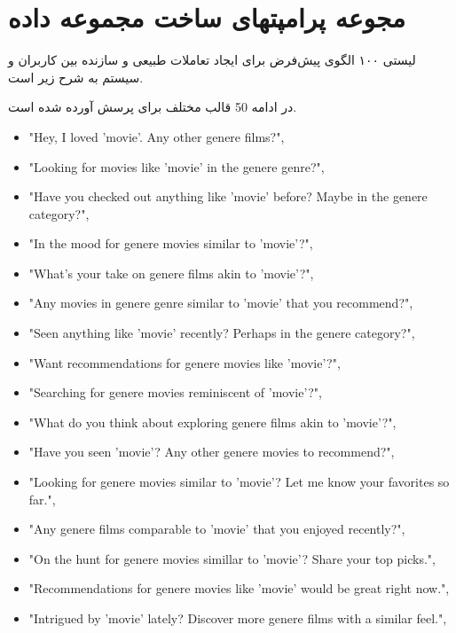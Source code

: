 
\chapter{مجوعه پرامپتهای ساخت مجموعه داده}
\label{app:naturalDiscussionTemplate}

\thispagestyle{empty}



لیستی ۱۰۰ الگوی پیش‌فرض برای ایجاد تعاملات طبیعی و سازنده بین کاربران و سیستم  به شرح زیر است.

در ادامه 50 قالب مختلف برای پرسش آورده شده است.

\begin{LTR}
\begin{itemize}
\item    
"Hey, I loved '{movie}'. Any other {genere} films?",
\item
"Looking for movies like '{movie}' in the {genere} genre?",
\item
"Have you checked out anything like '{movie}' before? Maybe in the {genere} category?",
\item
"In the mood for {genere} movies similar to '{movie}'?",
\item
"What's your take on {genere} films akin to '{movie}'?",
\item
"Any movies in {genere} genre similar to '{movie}' that you recommend?",
\item
"Seen anything like '{movie}' recently? Perhaps in the {genere} category?",
\item
"Want recommendations for {genere} movies like '{movie}'?",
\item
"Searching for {genere} movies reminiscent of '{movie}'?",
\item
"What do you think about exploring {genere} films akin to '{movie}'?",
\item
"Have you seen '{movie}'? Any other {genere} movies to recommend?",
\item
"Looking for {genere} movies similar to '{movie}'? Let me know your favorites so far.",
\item
"Any {genere} films comparable to '{movie}' that you enjoyed recently?",
\item
"On the hunt for {genere} movies simillar to '{movie}'? Share your top picks.",
\item
"Recommendations for {genere} movies like '{movie}' would be great right now.",
\item
"Intrigued by '{movie}' lately? Discover more {genere} films with a similar feel.",

\end{itemize}
\end{LTR}
